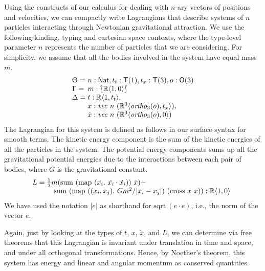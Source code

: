 \documentclass[preprint]{sigplanconf}
\newcommand{\typeOfCartSp}[1]{\lbag #1 \rbag}
\theoremstyle{examplestyle}
\begin{document}
Using the constructs of our calculus for dealing with $n$-ary vectors
of positions and velocities, we can compactly write Lagrangians that
describe systems of $n$ particles interacting through Newtonian
gravitational attraction. We use the following kinding, typing and
cartesian space contexts, where the type-level parameter $n$
represents the number of particles that we are considering. For
simplicity, we assume that all the bodies involved in the system have
equal mass $m$.
\begin{displaymath}
  \begin{array}{l@{\hspace{0.3em}}l}
    \Theta = & n : \mathsf{Nat}, t_t : \mathsf{T}(1), t_x : \mathsf{T}(3), o : \mathsf{O}(3) \\
    \Gamma = & m : \typeOfCartSp{\mathbb{R}\langle 1, 0 \rangle} \\
    \Delta = &
    \begin{array}[t]{@{}l}
      t : \mathbb{R}\langle 1, t_t \rangle, \\
      x : \mathit{vec}~n~(\mathbb{R}^3\langle \mathit{ortho}_3(o), t_x \rangle), \\
      \dot{x} : \mathit{vec}~n~(\mathbb{R}^3\langle \mathit{ortho}_3(o), 0 \rangle)
    \end{array}
  \end{array}
\end{displaymath}
The Lagrangian for this system is defined as follows in our surface
syntax for smooth terms. The kinetic energy component is the sum of
the kinetic energies of all the particles in the system. The potential
energy components sums up all the gravitational potential energies due
to the interactions between each pair of bodies, where $G$ is the
gravitational constant.
\begin{displaymath}
  L =
  \begin{array}[t]{@{}l}
    \frac{1}{2}m(\mathrm{sum}~(\mathrm{map}~(\dot{x_i}.~\dot{x_i}\cdot\dot{x_i}))~\dot{x}) - \\
    \quad \mathrm{sum}~(\mathrm{map}~((x_i,x_j).~Gm^2/|x_i - x_j|)~(\mathrm{cross}~x~x)) : \mathbb{R}\langle 1, 0 \rangle
  \end{array}
\end{displaymath}
We have used the notation $|e|$ as shorthand for $\mathrm{sqrt}~(e
\cdot e)$, i.e., the norm of the vector $e$.

Again, just by looking at the types of $t$, $x$, $\dot{x}$, and $L$,
we can determine via free theorems that this Lagrangian is invariant
under translation in time and space, and under all orthogonal
transformations. Hence, by Noether's theorem, this system has energy
and linear and angular momentum as conserved quantities.
\end{document}
